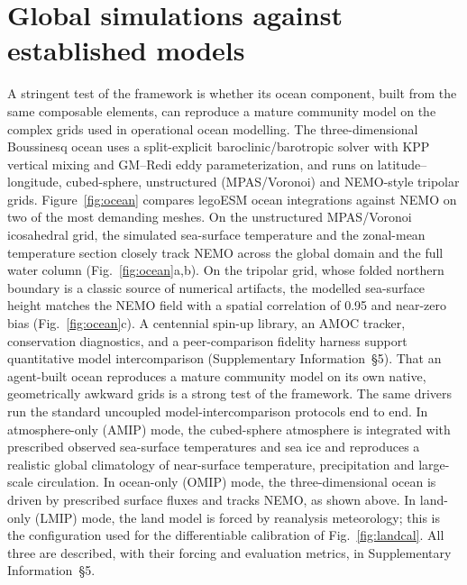 \documentclass[11pt]{article}
\begin{document}
\section*{Global simulations against established models}
A stringent test of the framework is whether its ocean component, built from the same
composable elements, can reproduce a mature community model on the complex grids used in
operational ocean modelling. The three-dimensional Boussinesq ocean uses a split-explicit baroclinic/barotropic
solver\cite{ShchepetkinMcWilliams2005} with KPP vertical mixing\cite{LMD1994} and GM--Redi eddy
parameterization\cite{GM1990}, and runs on latitude--longitude, cubed-sphere, unstructured
(MPAS/Voronoi) and NEMO-style tripolar grids.
Figure~\ref{fig:ocean} compares legoESM ocean integrations against
NEMO\cite{Madec2017} on two of the most demanding meshes. On the unstructured MPAS/Voronoi
icosahedral grid, the simulated sea-surface temperature and the zonal-mean temperature section
closely track NEMO across the global domain and the full water column
(Fig.~\ref{fig:ocean}a,b). On the tripolar grid, whose folded northern boundary is a classic
source of numerical artifacts, the modelled sea-surface height matches the NEMO field with a
spatial correlation of 0.95 and near-zero bias (Fig.~\ref{fig:ocean}c). A centennial spin-up
library, an AMOC tracker, conservation diagnostics, and a peer-comparison fidelity harness
support quantitative model intercomparison (Supplementary Information~\S5). That an
agent-built ocean reproduces a mature community model on its own native, geometrically awkward
grids is a strong test of the framework. The same drivers run the standard uncoupled
model-intercomparison protocols end to end. In atmosphere-only (AMIP) mode, the cubed-sphere
atmosphere is integrated with prescribed observed sea-surface temperatures and sea ice and
reproduces a realistic global climatology of near-surface temperature, precipitation and
large-scale circulation. In ocean-only (OMIP) mode, the three-dimensional ocean is driven by
prescribed surface fluxes and tracks NEMO, as shown above. In land-only (LMIP) mode, the land
model is forced by reanalysis meteorology; this is the configuration used for the differentiable
calibration of Fig.~\ref{fig:landcal}. All three are described, with their forcing and evaluation
metrics, in Supplementary Information~\S5.
\end{document}
